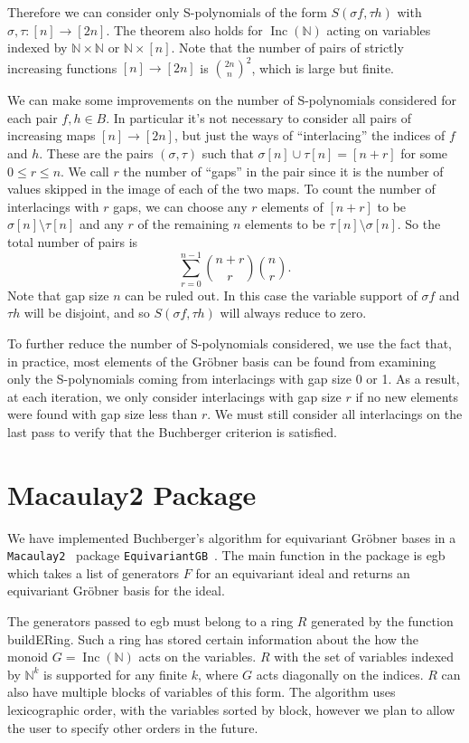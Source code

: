 \documentclass[10pt]{amsart}
\theoremstyle{definition}
\theoremstyle{remark}
\numberwithin{equation}{section}
\newcommand{\B}[1]{\mathbb #1}
\newcommand{\<}{\langle}
\renewcommand{\>}{\rangle}
\newcommand{\Inc}{\operatorname{Inc}(\B N)}
\begin{document}
Therefore we can consider only S-polynomials of the form $S(\sigma f,\tau h)$ with $\sigma,\tau: [n] \to [2n]$.  The theorem also holds for $\Inc$ acting on variables indexed by $\B N \times \B N$ or $\B N \times [n]$.  Note that the number of pairs of strictly increasing functions $[n] \to [2n]$ is $\binom{2n}{n}^2$, which is large but finite.

We can make some improvements on the number of S-polynomials considered for each pair $f,h \in B$.  In particular it's not necessary to consider all pairs of increasing maps $[n] \to [2n]$, but just the ways of ``interlacing'' the indices of $f$ and $h$.  These are the pairs $(\sigma,\tau)$ such that $\sigma[n] \cup \tau[n] = [n+r]$ for some $0 \leq r \leq n$.  We call $r$ the number of ``gaps'' in the pair since it is the number of values skipped in the image of each of the two maps.  To count the number of interlacings with $r$ gaps, we can choose any $r$ elements of $[n+r]$ to be $\sigma[n] \setminus \tau[n]$ and any $r$ of the remaining $n$ elements to be $\tau[n] \setminus \sigma[n]$.  So the total number of pairs is
 \[ \sum_{r=0}^{n-1} \binom{n+r}{r}\binom{n}{r}. \]
Note that gap size $n$ can be ruled out.  In this case the variable support of $\sigma f$ and $\tau h$ will be disjoint, and so $S(\sigma f, \tau h)$ will always reduce to zero.

To further reduce the number of S-polynomials considered, we use the fact that, in practice, most elements of the Gr\"obner basis can be found from examining only the S-polynomials coming from interlacings with gap size 0 or 1.  As a result, at each iteration, we only consider interlacings with gap size $r$ if no new elements were found with gap size less than $r$.  We must still consider all interlacings on the last pass to verify that the Buchberger criterion is satisfied.

\section{Macaulay2 Package}
We have implemented Buchberger's algorithm for equivariant Gr\"obner bases in a {\tt Macaulay2}~\cite{M2www} package {\tt EquivariantGB}~\cite{EquivariantGB}. The main function in the package is {\ttfamily egb} which takes a list of generators $F$ for an equivariant ideal and returns an equivariant Gr\"obner basis for the ideal.

The generators passed to {\ttfamily egb} must belong to a ring $R$ generated by the function {\ttfamily buildERing}.  Such a ring has stored certain information about the how the monoid $G = \Inc$ acts on the variables.  $R$ with the set of variables indexed by $\B N^k$ is supported for any finite $k$, where $G$ acts diagonally on the indices.   $R$ can also have multiple blocks of variables of this form.  The algorithm uses lexicographic order, with the variables sorted by block, however we plan to allow the user to specify other orders in the future.
\end{document}
